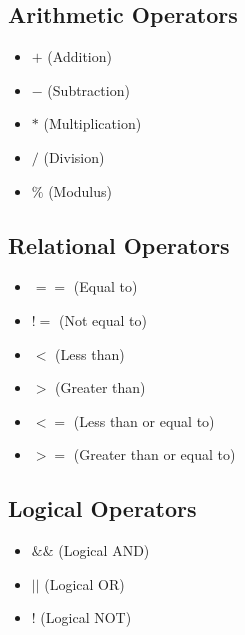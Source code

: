 \documentclass{report}
\begin{document}
    \pagebreak
    \bigbreak \noindent 
    \begin{minipage}[t]{0.47\textwidth}
        \subsection{Arithmetic Operators}
        \begin{itemize}
          \item \( + \) (Addition)
          \item \( - \) (Subtraction)
          \item \( * \) (Multiplication)
          \item \( / \) (Division)
          \item \( \% \) (Modulus)
        \end{itemize}
    \end{minipage}
    \begin{minipage}[t]{0.47\textwidth}
     \subsection{Relational Operators}
    \begin{itemize}
      \item \( == \) (Equal to)
      \item \( != \) (Not equal to)
      \item \( < \) (Less than)
      \item \( > \) (Greater than)
      \item \( <= \) (Less than or equal to)
      \item \( >= \) (Greater than or equal to)
    \end{itemize}
    \end{minipage}
    \bigbreak \noindent 
    \begin{minipage}[t]{0.47\textwidth}
    \subsection{Logical Operators}
    \begin{itemize}
      \item \( \&\& \) (Logical AND)
      \item \( || \) (Logical OR)
      \item \( ! \) (Logical NOT)
    \end{itemize}
    \end{minipage}
\end{document}
